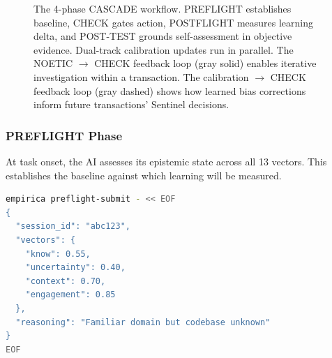 \begin{figure}[h]
\caption{The 4-phase CASCADE workflow. PREFLIGHT establishes baseline, CHECK gates action, POSTFLIGHT measures learning delta, and POST-TEST grounds self-assessment in objective evidence. Dual-track calibration updates run in parallel. The NOETIC $\rightarrow$ CHECK feedback loop (gray solid) enables iterative investigation within a transaction. The calibration $\rightarrow$ CHECK feedback loop (gray dashed) shows how learned bias corrections inform future transactions' Sentinel decisions.}
\label{fig:cascade-workflow}
\end{figure}

\subsubsection{PREFLIGHT Phase}

At task onset, the AI assesses its epistemic state across all 13 vectors. This establishes the baseline against which learning will be measured.

\begin{lstlisting}[language=bash,caption={Example PREFLIGHT submission},showspaces=false,showstringspaces=false]
empirica preflight-submit - << EOF
{
  "session_id": "abc123",
  "vectors": {
    "know": 0.55,
    "uncertainty": 0.40,
    "context": 0.70,
    "engagement": 0.85
  },
  "reasoning": "Familiar domain but codebase unknown"
}
EOF
\end{lstlisting}

